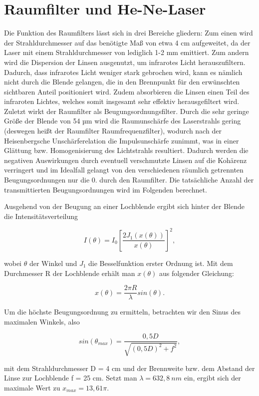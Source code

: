 \documentclass[bigchapter,colorback,accentcolor=tud4b,linedtoc,11pt]{tudreport}
\begin{document}
\section{Raumfilter und He-Ne-Laser}

Die Funktion des Raumfilters lässt sich in drei Bereiche gliedern: Zum einen wird der Strahldurchmesser auf das benötigte Maß von etwa 4 cm aufgeweitet, da der Laser mit einem Strahldurchmesser von lediglich 1-2 mm emittiert. Zum andern wird die Dispersion der Linsen ausgenutzt, um infrarotes Licht herauszufiltern. Dadurch, dass infrarotes Licht weniger stark gebrochen wird, kann es nämlich nicht durch die Blende gelangen, die in den Brennpunkt für den erwünschten sichtbaren Anteil positioniert wird. Zudem absorbieren die Linsen einen Teil des infraroten Lichtes, welches somit insgesamt sehr effektiv herausgefiltert wird. Zuletzt wirkt der Raumfilter als Beugungsordnungsfilter. Durch die sehr geringe Größe der Blende von 54 µm wird die Raumunschärfe des Laserstrahls gering (deswegen heißt der Raumfilter Raumfrequenzfilter), wodurch nach der Heisenbergsche Unschärferelation die Impulsunschärfe zunimmt, was in einer Glättung bzw. Homogenisierung des Lichtstrahls resultiert. Dadurch werden die negativen Auswirkungen durch eventuell verschmutzte Linsen auf die Kohärenz verringert und im Idealfall gelangt von den verschiedenen räumlich getrennten Beugungsordnungen nur die 0. durch den Raumfilter. Die tatsächliche Anzahl der transmittierten Beugungsordnungen wird im Folgenden berechnet.

Ausgehend von der Beugung an einer Lochblende ergibt sich hinter der Blende die Intensitätsverteilung

$$I(\theta) = I_0 \left[ \frac{2 J_1(x(\theta))}{x(\theta)} \right]^2,$$

wobei $\theta$ der Winkel und $J_1$ die Besselfunktion erster Ordnung ist. Mit dem Durchmesser R der Lochblende erhält man $x(\theta)$ aus folgender Gleichung: 

$$x(\theta) = \frac{2 \pi R}{\lambda} sin(\theta).$$

Um die höchste Beugungsordnung zu ermitteln, betrachten wir den Sinus des maximalen Winkels, also

$$sin(\theta_{max}) = \frac{0,5 D}{\sqrt{(0,5 D)^2 + f^2}},$$

mit dem Strahldurchmesser D = 4 cm und der Brennweite bzw. dem Abstand der Linse zur Lochblende f = 25 cm. Setzt man $\lambda = 632,8~nm$ ein, ergibt sich der maximale Wert zu $x_{max} = 13,61 \pi$.
\end{document}
